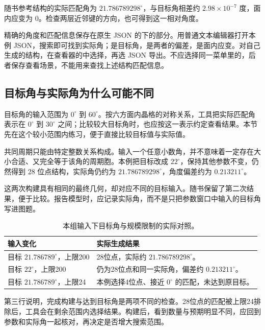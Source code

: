 随书参考结构的实际匹配角为 $21.786789298^\circ$，与目标角相差约 $2.98\times10^{-7}$ 度，面内应变为 0。检查两层近邻键的方向，也可得到这一相对角度。

精确的角度和匹配信息保存在原生 JSON 的下的部分。用普通文本编辑器打开本例 JSON，搜索即可找到实际角；是目标角，是两者的偏差，是面内应变。对自己生成的结构，在查看器的中选择，再选 JSON 导出。不应选择同一菜单里的，后者保存查看场景，不能用来查找上述结构匹配信息。

\subsection{目标角与实际角为什么可能不同}

目标角的输入范围为 $0^\circ$ 到 $60^\circ$。按六方面内晶格的对称关系，工具把实际匹配角表示在 $0^\circ$ 到 $30^\circ$ 之间；比较较大目标角时，也应按这一表示约定查看结果。本节先在这个较小范围内练习，便于直接比较目标值与实际值。

共同周期只能由特定整数关系构成。输入一个任意小数角，并不意味着一定存在大小合适、又完全等于该角的周期胞。本例把目标改成 $22^\circ$，保持其他参数不变，仍然得到 28 位点结构，实际角仍约为 $21.786789298^\circ$，角度偏差约为 $0.213211^\circ$。

这两次构建具有相同的最终几何，却对应不同的目标输入。随书保留了第二次结果，便于比较。报告模型时，应记录实际角，而不是只把参数窗口中输入的目标角写进图题。

\begin{table}[htbp]
\centering
\caption{本组输入下目标角与规模限制的实际对照。}
\begin{tabularx}{\linewidth}{lX}
\toprule
输入变化 & 实际生成结果\\
\midrule
目标 $21.786789^\circ$，上限200 & 28位点，实际约 $21.786789298^\circ$。\\
目标 $22^\circ$，上限200 & 仍为28位点和同一实际角，偏差约 $0.213211^\circ$。\\
目标 $21.786789^\circ$，上限24 & 本例选择4位点、接近 $0^\circ$ 的匹配，未达到原目标。\\
\bottomrule
\end{tabularx}
\end{table}

第三行说明，完成构建与达到目标角是两项不同的检查。28位点的匹配被上限24排除后，工具会在剩余范围内选择结果。构建后，看到数量与预期明显不同，应回到参数和实际角一起核对，再决定是否增大搜索范围。

